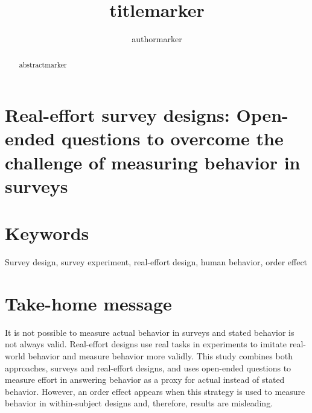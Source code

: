 \documentclass[twocolumn, serif, empirical, authordate]{jote-article}
\title{titlemarker}
\author[1]{authormarker}
\affil[1]{affilmarker}
\begin{document}
    \begin{frontmatter}
    \maketitle
    \begin{abstract}
    abstractmarker
    \end{abstract}
    \end{frontmatter}

\section*{Real-effort survey designs: Open-ended questions to overcome the challenge of measuring behavior in surveys}
\label{sec:Real-effort survey designs: Open-ended questions to overcome the challenge of measuring behavior in surveys}


\section*{Keywords}
\label{sec:Keywords}

Survey design, survey experiment, real-effort design, human behavior, order effect 
\section*{Take-home message}
\label{sec:Take-home message}

It is not possible to measure actual behavior in surveys and stated behavior is not always valid. Real-effort designs use real tasks in experiments to imitate real-world behavior and measure behavior more validly. This study combines both approaches, surveys and real-effort designs, and uses open-ended questions to measure effort in answering behavior as a proxy for actual instead of stated behavior. However, an order effect appears when this strategy is used to measure behavior in within-subject designs and, therefore, results are misleading.


\end{document}
